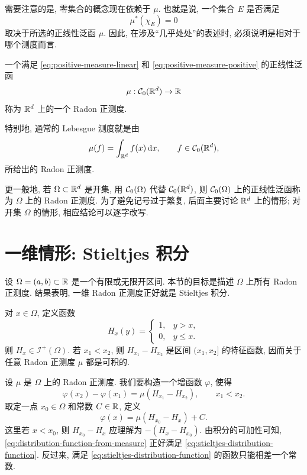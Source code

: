 \begin{rem}
	需要注意的是, 零集合的概念现在依赖于 \(\mu\). 也就是说, 一个集合 \(E\) 是否满足
	\[
	\mu^*(\chi_E)=0
	\]
	取决于所选的正线性泛函 \(\mu\). 因此, 在涉及``几乎处处''的表述时, 必须说明是相对于哪个测度而言.
\end{rem}

\begin{defn}
	\label{def:positive-radon-measure}
	一个满足 \eqref{eq:positive-measure-linear} 和 \eqref{eq:positive-measure-positive} 的正线性泛函
	\[
	\mu:
	\mathcal{C}_0(\mathbb{R}^d)\to\mathbb{R}
	\]
	称为 \(\mathbb{R}^d\) 上的一个 Radon 正测度.
\end{defn}

特别地, 通常的 Lebesgue 测度就是由
\[
\mu(f)=\int_{\mathbb{R}^d}f(x)\,\dd x,
\qquad f\in\mathcal{C}_0(\mathbb{R}^d),
\]
所给出的 Radon 正测度.

更一般地, 若 \(\Omega\subset\mathbb{R}^d\) 是开集, 用 \(\mathcal{C}_0(\Omega)\) 代替 \(\mathcal{C}_0(\mathbb{R}^d)\), 则 \(\mathcal{C}_0(\Omega)\) 上的正线性泛函称为 \(\Omega\) 上的 Radon 正测度. 为了避免记号过于繁复, 后面主要讨论 \(\mathbb{R}^d\) 上的情形; 对开集 \(\Omega\) 的情形, 相应结论可以逐字改写.

\clearpage

\section{一维情形: Stieltjes 积分}
\label{sec:one-dimensional-stieltjes-integral}

设 \(\Omega=(a,b)\subset\mathbb{R}\) 是一个有限或无限开区间. 本节的目标是描述 \(\Omega\) 上所有 Radon 正测度. 结果表明, 一维 Radon 正测度正好就是 Stieltjes 积分.

对 \(x\in\Omega\), 定义函数
\[
H_x(y)=
\begin{cases}
	1, & y>x,\\
	0, & y\leq x.
\end{cases}
\]
则 \(H_x\in\mathcal I^+(\Omega)\). 若 \(x_1<x_2\), 则 \(H_{x_1}-H_{x_2}\) 是区间 \((x_1,x_2]\) 的特征函数, 因而关于任意 Radon 正测度 \(\mu\) 都是可积的.

设 \(\mu\) 是 \(\Omega\) 上的 Radon 正测度. 我们要构造一个增函数 \(\varphi\), 使得
\begin{equation}
	\varphi(x_2)-\varphi(x_1)
	=
	\mu(H_{x_1}-H_{x_2}),
	\qquad x_1<x_2.
	\label{eq:stieltjes-distribution-function}
\end{equation}
取定一点 \(x_0\in\Omega\) 和常数 \(C\in\mathbb{R}\), 定义
\begin{equation}
	\varphi(x)=\mu(H_{x_0}-H_x)+C.
	\label{eq:distribution-function-from-measure}
\end{equation}
这里若 \(x<x_0\), 则 \(H_{x_0}-H_x\) 应理解为 \(- (H_x-H_{x_0})\). 由积分的可加性可知, \eqref{eq:distribution-function-from-measure} 正好满足 \eqref{eq:stieltjes-distribution-function}. 反过来, 满足 \eqref{eq:stieltjes-distribution-function} 的函数只能相差一个常数.


